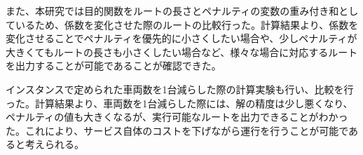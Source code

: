 また、本研究では目的関数をルートの長さとペナルティの変数の重み付き和としているため、係数を変化させた際のルートの比較行った。計算結果より、係数を変化させることでペナルティを優先的に小さくしたい場合や、少しペナルティが大きくてもルートの長さも小さくしたい場合など、様々な場合に対応するルートを出力することが可能であることが確認できた。

インスタンスで定められた車両数を1台減らした際の計算実験も行い、比較を行った。計算結果より、車両数を1台減らした際には、解の精度は少し悪くなり、ペナルティの値も大きくなるが、実行可能なルートを出力できることがわかった。これにより、サービス自体のコストを下げながら運行を行うことが可能であると考えられる。
